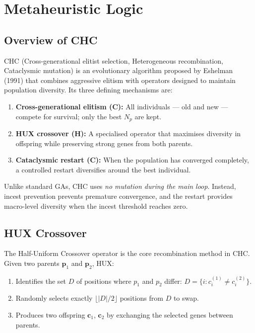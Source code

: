 \documentclass[12pt, a4paper]{article}
\begin{document}
\section{Metaheuristic Logic}

\subsection{Overview of CHC}

CHC (Cross-generational elitist selection, Heterogeneous recombination, Cataclysmic
mutation) is an evolutionary algorithm proposed by Eshelman (1991) that combines
aggressive elitism with operators designed to maintain population diversity. Its
three defining mechanisms are:
\begin{enumerate}[itemsep=0.2em]
  \item \textbf{Cross-generational elitism (C):} All individuals — old and new — compete
        for survival; only the best $N_p$ are kept.
  \item \textbf{HUX crossover (H):} A specialised operator that maximises diversity in
        offspring while preserving strong genes from both parents.
  \item \textbf{Cataclysmic restart (C):} When the population has converged completely,
        a controlled restart diversifies around the best individual.
\end{enumerate}

Unlike standard GAs, CHC uses \emph{no mutation during the main loop}. Instead,
incest prevention prevents premature convergence, and the restart provides macro-level
diversity when the incest threshold reaches zero.

\subsection{HUX Crossover}

The Half-Uniform Crossover operator is the core recombination method in CHC. Given
two parents $\mathbf{p}_1$ and $\mathbf{p}_2$, HUX:
\begin{enumerate}[itemsep=0.1em]
  \item Identifies the set $D$ of positions where $p_1$ and $p_2$ differ:
        $D = \{i : c_i^{(1)} \neq c_i^{(2)}\}$.
  \item Randomly selects exactly $\lfloor |D|/2 \rfloor$ positions from $D$ to swap.
  \item Produces two offspring $\mathbf{c}_1$, $\mathbf{c}_2$ by exchanging the
        selected genes between parents.
\end{enumerate}
\end{document}
